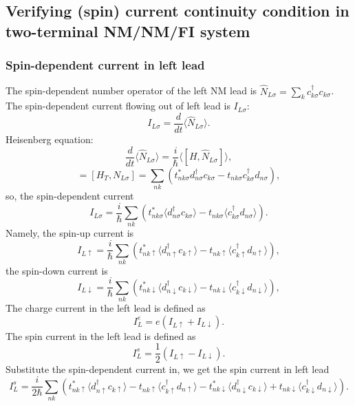 \documentclass[aps,prb,superscriptaddress]{revtex4-2}
\begin{document}
\subsection{Verifying (spin) current continuity condition in two-terminal NM/NM/FI system}
\subsubsection{Spin-dependent current in left lead}
The spin-dependent number operator of the left NM lead is $\hat N_{L\sigma} = \sum_{k} c_{k\sigma}^{\dag}c_{k\sigma}$. The spin-dependent current flowing out of left lead is $I_{L\sigma}$:
\begin{equation}
I_{L\sigma} = \frac{d}{dt} \langle \hat N_{L\sigma} \rangle.
\end{equation}
Heisenberg equation:
\begin{equation}
\frac{d}{dt} \langle \hat N_{L\sigma} \rangle = \frac{i}{\hbar} \langle [H, \hat N_{L\sigma}]\rangle,
\end{equation}
\begin{equation}
[H, N_{L\sigma}] = [H_{T}, N_{L\sigma}] =  \sum_{nk}\left(t_{nk \sigma}^{*} d_{n\sigma}^{\dagger} c_{k \sigma} - t_{nk \sigma} c_{k \sigma}^{\dagger} d_{n\sigma} \right),
\end{equation}
so, the spin-dependent current
\begin{equation}
I_{L\sigma} = \frac{i}{\hbar} \sum_{nk} \left( t_{nk \sigma}^{*} \langle  d_{n\sigma}^{\dagger} c_{k \sigma}\rangle - t_{nk \sigma} \langle c_{k \sigma}^{\dagger} d_{n\sigma} \rangle \right).
\end{equation}
Namely, the spin-up current is
\begin{equation}
I_{L\uparrow} = \frac{i}{\hbar} \sum_{nk} \left( t_{nk \uparrow}^{*} \langle  d_{n\uparrow}^{\dagger} c_{k \uparrow}\rangle - t_{nk \uparrow} \langle c_{k \uparrow}^{\dagger} d_{n\uparrow} \rangle \right),
\end{equation}
the spin-down current is
\begin{equation}
I_{L\downarrow} = \frac{i}{\hbar} \sum_{nk} \left( t_{nk \downarrow}^{*} \langle  d_{n\downarrow}^{\dagger} c_{k \downarrow}\rangle - t_{nk \downarrow} \langle c_{k \downarrow}^{\dagger} d_{n\downarrow} \rangle \right),
\end{equation}
The charge current in the left lead is defined as
\begin{equation}
I_L^e = e(I_{L\uparrow} + I_{L\downarrow}).
\end{equation}
The spin current in the left lead is defined as
\begin{equation}
I_L^s = \frac{1}{2}(I_{L\uparrow} - I_{L\downarrow}).
\end{equation}
Substitute the spin-dependent current in, we get the spin current in left lead
\begin{equation}
I_L^s = \frac{i}{2\hbar} \sum_{nk} \left( t_{nk \uparrow}^{*} \langle  d_{n\uparrow}^{\dagger} c_{k \uparrow}\rangle - t_{nk \uparrow} \langle c_{k \uparrow}^{\dagger} d_{n\uparrow} \rangle -  t_{nk \downarrow}^{*} \langle  d_{n\downarrow}^{\dagger} c_{k \downarrow}\rangle + t_{nk \downarrow} \langle c_{k \downarrow}^{\dagger} d_{n\downarrow} \rangle \right).
\end{equation}
\end{document}
